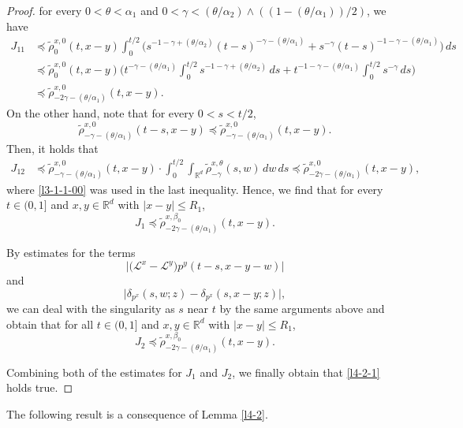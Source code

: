 \documentclass[a4paper,11pt]{amsart}
\renewcommand{\le}{\leqslant}
\newcommand{\R}{\mathds R}
\newcommand{\B}{\beta}
\newcommand{\T}{\theta}
\newcommand{\p}{\preceq}
\newcommand{\A}{\alpha}
\newcommand{\G}{\gamma}
\def\LL{{\mathcal L}}
\theoremstyle{definition}
\begin{document}
\begin{proof}
for every $0<\theta<\A_1$ and $0<\gamma<({\theta}/{\A_2})\wedge ((1-({\theta}/{\A_1}))/2)$, we have
\begin{equation}\label{l4-2-3a}
\begin{split}
J_{11}&\p \tilde \rho^{x,0}_0(t,x-y) \int_0^{{t}/{2}}\big(s^{-1-\G+({\T}/{\A_2})}(t-s)^{-\G-({\T}/{\A_1})}
+s^{-\G}(t-s)^{-1-\G-({\T}/{\A_1})}\big)\,ds\\
&\p \tilde \rho^{x,0}_0(t,x-y) \bigg(t^{-\G-({\T}/{\A_1})}\int_0^{{t}/{2}}s^{-1-\G+({\T}/{\A_2})}\,ds+
t^{-1-\G-({\T}/{\A_1})}\int_0^{{t}/{2}} s^{-\G}\,ds\bigg)\\
& \p  \tilde \rho^{x,0}_{-2\G-({\T}/{\A_1})}(t,x-y).
\end{split}
\end{equation}
On the other hand, note that for every $0<s<{t}/{2}$, $$\tilde \rho^{x,0}_{-\G-({\T}/{\A_1})}(t-s,x-y)\p \tilde \rho^{x,0}_{-\G-({\T}/{\A_1})}(t,x-y).$$
Then, it holds that
\begin{align*}
J_{12}&\p  \tilde \rho^{x,0}_{-\G-({\T}/{\A_1})}(t,x-y)\cdot
\int_0^{{t}/{2}}\int_{\R^d}\tilde \rho^{x,\T}_{-\G}(s,w)\,dw\,ds\p \tilde \rho^{x,0}_{-2\G-({\T}/{\A_1})}(t,x-y),
\end{align*} where \eqref{l3-1-1-00} was used in the last inequality.
Hence, we find that for every $t\in (0,1]$ and $x,y \in \R^d$ with $|x-y|\le R_1$,
\begin{equation*}
J_1 \p \tilde \rho^{x,\B_0}_{-2\G-({\T}/{\A_1})}(t,x-y).
\end{equation*}

By estimates for
 the terms
$$\big|\big( \LL^x- \LL^y\big)p^y(t-s,x-y-w)\big|$$ and $$\big|
\delta_{p^x}(s,w;z)-\delta_{p^x}(s,x-y;z)\big|,$$ we can deal with the singularity
as $s$ near $t$ by the same arguments above and obtain that for all $t\in (0,1]$ and $x,y\in \R^d$ with $|x-y|\le R_1$,
\begin{equation*}
J_2 \p \tilde \rho^{x,\B_0}_{-2\G-({\T}/{\A_1})}(t,x-y).
\end{equation*}


Combining both of the estimates for $J_1$ and $J_2$, we finally obtain that \eqref{l4-2-1} holds true.
\end{proof}
The following result is a consequence of Lemma \ref{l4-2}.
\end{document}

